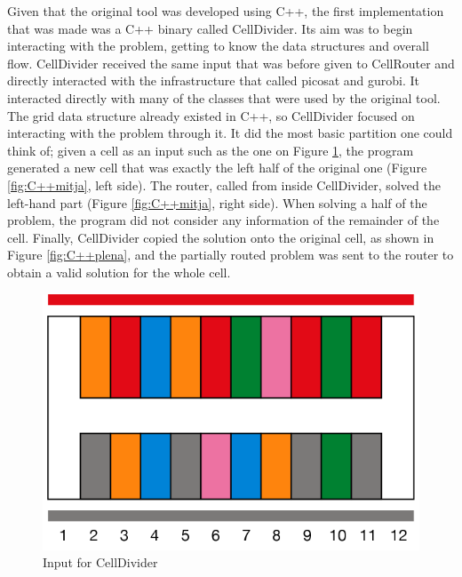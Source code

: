 Given that the original tool was developed using C++, the first implementation that was made was a C++ binary called CellDivider. Its aim was to begin interacting with the problem, getting to know the data structures and overall flow. CellDivider received the same input that was before given to CellRouter and directly interacted with the infrastructure that called picosat and gurobi. It interacted directly with many of the classes that were used by the original tool. The grid data structure already existed in C++, so CellDivider focused on interacting with the problem through it. It did the most basic partition one could think of; given a cell as an input such as the one on Figure \ref{fig:C++buida}, the program generated a new cell that was exactly the left half of the original one (Figure \ref{fig:C++mitja}, left side). The router, called from inside CellDivider, solved the left-hand part (Figure \ref{fig:C++mitja}, right side). When solving a half of the problem, the program did not consider any information of the remainder of the cell. Finally, CellDivider copied the solution onto the original cell, as shown in Figure \ref{fig:C++plena}, and the partially routed problem was sent to the router to obtain a valid solution for the whole cell. \\

\begin{figure}[h!]
  \centering
  \includegraphics[scale=0.5]{img/design/CompletabuidaC++.png}
  \caption{Input for CellDivider}
  \label{fig:C++buida}
\end{figure} 

